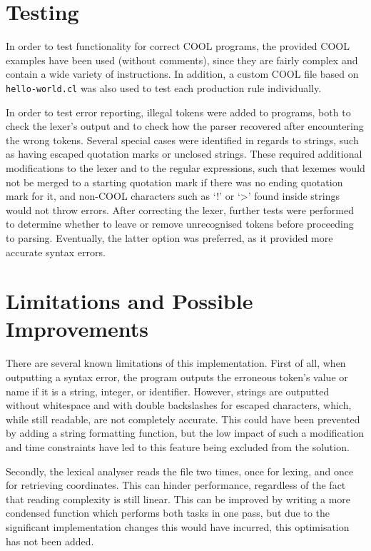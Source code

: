 \documentclass[10pt,a4paper,twocolumn]{article}
\begin{document}
\section*{Testing}
In order to test functionality for correct COOL programs, the provided COOL examples have been used (without comments), since they are fairly complex and contain a wide variety of instructions. In addition, a custom COOL file based on \texttt{hello-world.cl} was also used to test each production rule individually.

In order to test error reporting, illegal tokens were added to programs, both to check the lexer's output and to check how the parser recovered after encountering the wrong tokens. Several special cases were identified in regards to strings, such as having escaped quotation marks or unclosed strings. These required additional modifications to the lexer and to the regular expressions, such that lexemes would not be merged to a starting quotation mark if there was no ending quotation mark for it, and non-COOL characters such as `!' or `\textgreater' found inside strings would not throw errors. After correcting the lexer, further tests were performed to determine whether to leave or remove unrecognised tokens before proceeding to parsing. Eventually, the latter option was preferred, as it provided more accurate syntax errors.

\section*{Limitations and Possible Improvements}
There are several known limitations of this implementation. First of all, when outputting a syntax error, the program outputs the erroneous token's value or name if it is a string, integer, or identifier. However, strings are outputted without whitespace and with double backslashes for escaped characters, which, while still readable, are not completely accurate. This could have been prevented by adding a string formatting function, but the low impact of such a modification and time constraints have led to this feature being excluded from the solution.

Secondly, the lexical analyser reads the file two times, once for lexing, and once for retrieving coordinates. This can hinder performance, regardless of the fact that reading complexity is still linear. This can be improved by writing a more condensed function which performs both tasks in one pass, but due to the significant implementation changes this would have incurred, this optimisation has not been added.
\end{document}

